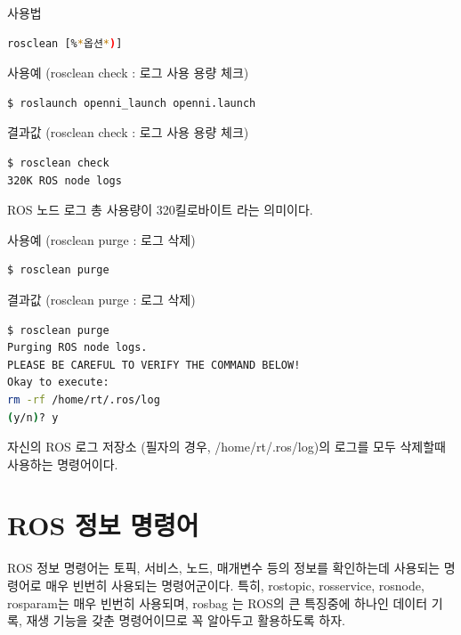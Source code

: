 \setcounter{num}{0}

\vspace{\baselineskip}
\noindent
{}\circled{\thenum} 사용법
\begin{lstlisting}[language=bash]
rosclean [%*옵션*)]
\end{lstlisting}

\noindent
{}\circled{\thenum} 사용예 (rosclean check : 로그 사용 용량 체크)
\begin{lstlisting}[language=bash]
$ roslaunch openni_launch openni.launch 
\end{lstlisting}

\noindent
{}\circled{\thenum} 결과값 (rosclean check : 로그 사용 용량 체크)
\begin{lstlisting}[language=bash]
$ rosclean check
320K ROS node logs
\end{lstlisting}

\noindent
ROS 노드 로그 총 사용량이 320킬로바이트 라는 의미이다.

\vspace{\baselineskip}
\noindent
{}\circled{\thenum} 사용예 (rosclean purge : 로그 삭제)
\begin{lstlisting}[language=bash]
$ rosclean purge
\end{lstlisting}

\noindent
{}\circled{\thenum} 결과값 (rosclean purge : 로그 삭제)
\begin{lstlisting}[language=bash]
$ rosclean purge 
Purging ROS node logs.
PLEASE BE CAREFUL TO VERIFY THE COMMAND BELOW!
Okay to execute:
rm -rf /home/rt/.ros/log
(y/n)? y
\end{lstlisting}

\noindent
자신의 ROS 로그 저장소 (필자의 경우, /home/rt/.ros/log)의 로그를 모두 삭제할때 사용하는 명령어이다.

\section{ROS 정보 명령어}

ROS 정보 명령어는 토픽, 서비스, 노드, 매개변수 등의 정보를 확인하는데 사용되는 명령어로 매우 빈번히 사용되는 명령어군이다. 특히, rostopic, rosservice, rosnode, rosparam는 매우 빈번히 사용되며, rosbag 는 ROS의 큰 특징중에 하나인 데이터 기록, 재생 기능을 갖춘 명령어이므로 꼭 알아두고 활용하도록 하자.

